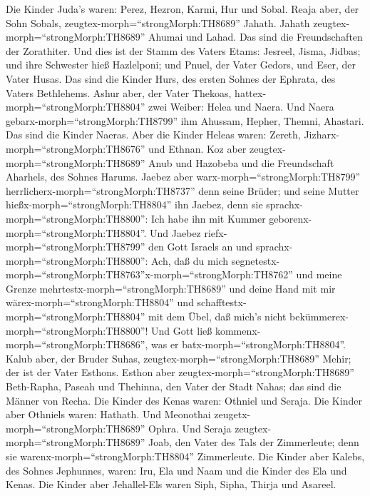 Die Kinder Juda's waren: Perez, Hezron, Karmi, Hur und
Sobal.  Reaja aber, der Sohn Sobals,
zeugtex-morph=``strongMorph:TH8689'' Jahath. Jahath
zeugtex-morph=``strongMorph:TH8689'' Ahumai und Lahad. Das sind die
Freundschaften der Zorathiter.  Und dies ist der Stamm des
Vaters Etams: Jesreel, Jisma, Jidbas; und ihre Schwester hieß
Hazlelponi;  und Pnuel, der Vater Gedors, und Eser, der
Vater Husas. Das sind die Kinder Hurs, des ersten Sohnes der Ephrata,
des Vaters Bethlehems.  Ashur aber, der Vater Thekoas,
hattex-morph=``strongMorph:TH8804'' zwei Weiber: Helea und Naera.
 Und Naera gebarx-morph=``strongMorph:TH8799'' ihm Ahussam,
Hepher, Themni, Ahastari. Das sind die Kinder Naeras.  Aber
die Kinder Heleas waren: Zereth, Jizharx-morph=``strongMorph:TH8676''
und Ethnan.  Koz aber zeugtex-morph=``strongMorph:TH8689''
Anub und Hazobeba und die Freundschaft Aharhels, des Sohnes Harums.
 Jaebez aber warx-morph=``strongMorph:TH8799''
herrlicherx-morph=``strongMorph:TH8737'' denn seine Brüder; und seine
Mutter hießx-morph=``strongMorph:TH8804'' ihn Jaebez, denn sie
sprachx-morph=``strongMorph:TH8800'': Ich habe ihn mit Kummer
geborenx-morph=``strongMorph:TH8804''.  Und Jaebez
riefx-morph=``strongMorph:TH8799'' den Gott Israels an und
sprachx-morph=``strongMorph:TH8800'': Ach, daß du mich
segnetestx-morph=``strongMorph:TH8763''x-morph=``strongMorph:TH8762''
und meine Grenze mehrtestx-morph=``strongMorph:TH8689'' und deine Hand
mit mir wärex-morph=``strongMorph:TH8804'' und
schafftestx-morph=``strongMorph:TH8804'' mit dem Übel, daß mich's nicht
bekümmerex-morph=``strongMorph:TH8800''! Und Gott ließ
kommenx-morph=``strongMorph:TH8686'', was er
batx-morph=``strongMorph:TH8804''.  Kalub aber, der Bruder
Suhas, zeugtex-morph=``strongMorph:TH8689'' Mehir; der ist der Vater
Esthons.  Esthon aber zeugtex-morph=``strongMorph:TH8689''
Beth-Rapha, Paseah und Thehinna, den Vater der Stadt Nahas; das sind die
Männer von Recha.  Die Kinder des Kenas waren: Othniel und
Seraja. Die Kinder aber Othniels waren: Hathath.  Und
Meonothai zeugetx-morph=``strongMorph:TH8689'' Ophra. Und Seraja
zeugtex-morph=``strongMorph:TH8689'' Joab, den Vater des Tals der
Zimmerleute; denn sie warenx-morph=``strongMorph:TH8804'' Zimmerleute.
 Die Kinder aber Kalebs, des Sohnes Jephunnes, waren: Iru,
Ela und Naam und die Kinder des Ela und Kenas.  Die Kinder
aber Jehallel-Els waren Siph, Sipha, Thirja und Asareel. 
